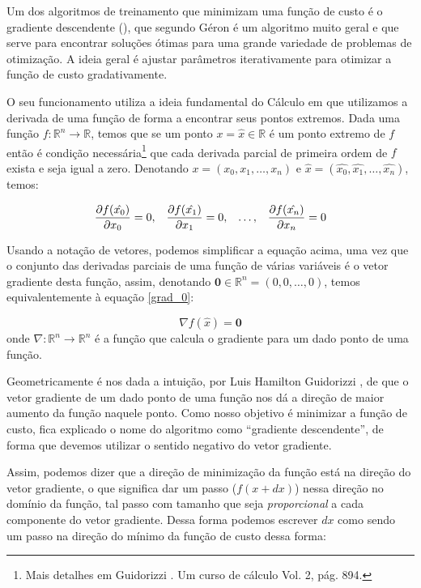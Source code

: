 Um dos algoritmos de treinamento que minimizam uma função de custo é o gradiente descendente (), que segundo Géron \citep{hands} é um algoritmo muito geral e que serve para encontrar soluções ótimas para uma grande variedade de problemas de otimização. A ideia geral é ajustar parâmetros iterativamente para otimizar a função de custo gradativamente.

O seu funcionamento utiliza a ideia fundamental do Cálculo em que utilizamos a derivada de uma função de forma a encontrar seus pontos extremos. Dada uma função $f{:}\mathbb{R}^n \rightarrow \mathbb{R}$, temos que se um ponto $x = \hat{x} \in \mathbb{R}$ é um ponto extremo de $f$ então é condição necessária\footnote{Mais detalhes em Guidorizzi \citep{guidorizzi2}. Um curso de cálculo Vol. 2, pág. 894.} que cada derivada parcial de primeira ordem de $f$ exista e seja igual a zero. Denotando $x = (x_0, x_1, \ldots, x_n)$ e $\hat{x} = (\hat{x_0}, \hat{x_1}, \ldots, \hat{x_n})$, temos:

\begin{equation}\label{grad_0}
\frac{\partial f(\hat{x_0})}{\partial x_0} = 0 ,\;\;\; \frac{\partial f(\hat{x_1})}{\partial x_1} = 0 ,\;\;\; \ldots ,\;\;\; \frac{\partial f(\hat{x_n})}{\partial x_n} = 0
\end{equation}

Usando a notação de vetores, podemos simplificar a equação acima, uma vez que o conjunto das derivadas parciais de uma função de várias variáveis é o vetor gradiente desta função, assim, denotando $\mathbf{0} \in \mathbb{R}^n = (0, 0, \ldots, 0)$, temos equivalentemente à equação \ref{grad_0}:

\begin{equation}\label{grad_1}
\nabla f(\hat{x}) = \mathbf{0}
\end{equation}
onde $\nabla{:}\mathbb{R}^n \rightarrow \mathbb{R}^n$ é a função que calcula o gradiente para um dado ponto de uma função.

Geometricamente é nos dada a intuição, por Luis Hamilton Guidorizzi \citep{guidorizzi2}, de que o vetor gradiente de um dado ponto de uma função nos dá a direção de maior aumento da função naquele ponto. Como nosso objetivo é minimizar a função de custo, fica explicado o nome do algoritmo como ``gradiente descendente'', de forma que devemos utilizar o sentido negativo do vetor gradiente.

Assim, podemos dizer que a direção de minimização da função está na direção do vetor gradiente, o que significa dar um passo ($f(x + dx)$) nessa direção no domínio da função, tal passo com tamanho que seja \emph{proporcional} a cada componente do vetor gradiente. Dessa forma podemos escrever $dx$ como sendo um passo na direção do mínimo da função de custo dessa forma:

